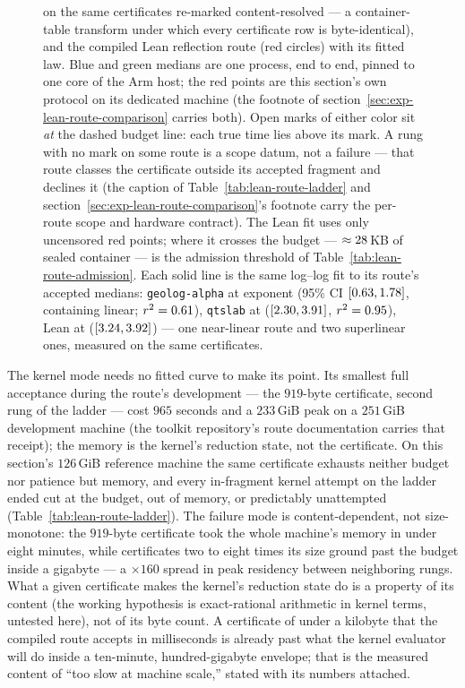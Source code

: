 \begin{figure}[htbp]
{on the same certificates re-marked content-resolved --- a
container-table transform under which every certificate row is
byte-identical), and the compiled Lean reflection route (red circles)
with its fitted law. Blue and green medians are one process, end to
end, pinned to one core of the Arm host; the red points are this
section's own protocol on its dedicated machine (the footnote of
section~\ref{sec:exp-lean-route-comparison} carries both). Open marks
of either color sit \emph{at} the dashed
budget line: each true time lies above its mark. A rung with no mark
on some route is a scope datum, not a failure --- that route classes
the certificate outside its accepted fragment and declines it (the
caption of Table~\ref{tab:lean-route-ladder} and
section~\ref{sec:exp-lean-route-comparison}'s footnote carry the
per-route scope and hardware contract). The Lean fit uses only
uncensored red points; where it crosses the budget ---
$\approx28$\,KB of sealed container --- is the
admission threshold of Table~\ref{tab:lean-route-admission}. Each
solid line is the same log--log fit to its route's accepted medians:
\texttt{geolog-alpha} at exponent \GlcRouteExponent{} (95\% CI
$[0.63,1.78]$, containing linear;
$r^2=0.61$), \texttt{qtslab} at \QtslabRouteExponent{}
($[2.30,3.91]$,
$r^2=0.95$), Lean at \LeanRouteExponent{}
($[3.24,3.92]$) --- one near-linear
route and two superlinear ones, measured on the same certificates.}
\label{fig:lean-route-scaling}
\end{figure}

The kernel mode needs no fitted curve to make its point. Its smallest
full acceptance during the route's development --- the $919$-byte
certificate, second rung of the ladder --- cost $965$ seconds and a
$233$\,GiB peak on a $251$\,GiB development machine (the toolkit
repository's route documentation carries that receipt); the memory is
the kernel's reduction state, not the certificate. On this section's
$126$\,GiB reference machine the same certificate exhausts neither
budget nor patience but memory, and every in-fragment kernel attempt
on the ladder ended cut at the budget, out of memory, or predictably
unattempted (Table~\ref{tab:lean-route-ladder}). The failure mode is
content-dependent, not size-monotone: the $919$-byte certificate took
the whole machine's memory in under eight minutes, while certificates
two to eight times its size ground past the budget inside a
gigabyte --- a $\times 160$ spread in peak residency between
neighboring rungs. What a given certificate makes the kernel's
reduction state do is a property of its content (the working
hypothesis is exact-rational arithmetic in kernel terms, untested
here), not of its byte count. A certificate of under a kilobyte
that the compiled route accepts in milliseconds is already past what
the kernel evaluator will do inside a ten-minute, hundred-gigabyte
envelope; that is the measured content of ``too slow at machine
scale,'' stated with its numbers attached.

